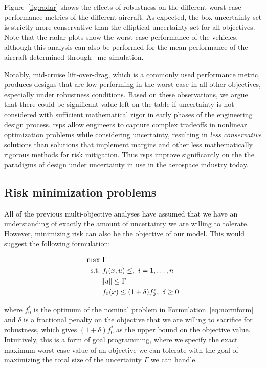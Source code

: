 Figure~\ref{fig:radar} shows the effects of robustness on
the different worst-case performance metrics of the different aircraft.
As expected, the box uncertainty set is strictly more conservative than the elliptical uncertainty set for
all objectives. Note that the radar plots show the worst-case performance of the vehicles, although
this analysis can also be performed for the mean performance
of the aircraft determined through ~\gls{mc} simulation.

Notably, mid-cruise lift-over-drag, which is a commonly used
performance metric, produces designs that are low-performing in the worst-case
in all other objectives, especially under robustness conditions.
Based on these observations, we argue that there could be significant value left on the table
if uncertainty is not considered with sufficient mathematical rigor in early phases of
the engineering design process. \gls{rsp}s allow engineers to capture complex
tradeoffs in nonlinear optimization problems while considering uncertainty,
resulting in \emph{less conservative} solutions
than solutions that implement margins and other less mathematically
rigorous methods for risk mitigation.
Thus \gls{rsp}s improve significantly on the
the paradigms of design under uncertainty in use
in the aerospace industry today.

\subsection{Risk minimization problems}

All of the previous multi-objective analyses have assumed that we have an
understanding of exactly the amount of uncertainty we are
willing to tolerate. However, minimizing risk can also be the objective of our
model. This would suggest the following formulation:

\begin{align}
    \begin{split}
    \text{max} &~\Gamma \\
    \text{s.t.}     &~f_i(x,u) \leq,~i = 1,\ldots,n \\
                    & \left\lVert u\right\rVert \leq \Gamma \\
                    &~f_0(x) \leq (1+\delta)f_0^*,~\delta \geq 0
    \end{split}
    \label{eq:goalprogramming}
\end{align}

where $f_0^*$ is the optimum of the nominal problem in Formulation~\ref{eq:normform} and $\delta$
is a fractional penalty on the objective that we are willing to sacrifice for robustness, which
gives $(1+\delta)f_0^*$ as the upper bound on the objective value. Intuitively,
this is a form of goal programming,
where we specify the exact maximum worst-case value of an objective we can tolerate with
the goal of maximizing the total size of the uncertainty $\Gamma$ we can handle.

